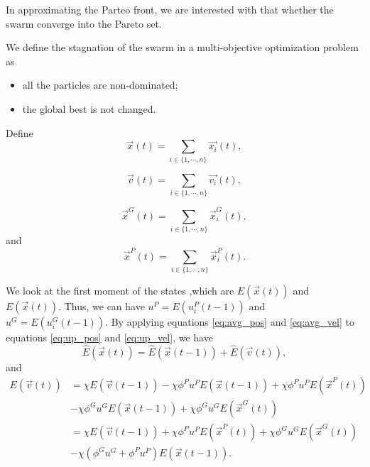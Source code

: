 \documentclass[12pt]{article}
\begin{document}
In approximating the Parteo front, we are interested with that whether the swarm converge into the Pareto set.

We define the stagnation of the swarm in a multi-objective optimization problem as
\begin{itemize}
\item all the particles are non-dominated;
\item the global best is not changed.
\end{itemize}

Define 
\begin{equation}
\label{eq:avg_pos}
\vec{x}(t) = \sum_{ i \in \{ 1, \cdots , n \} } \vec{x_{i}}(t),
\end{equation}

\begin{equation}
\label{eq:avg_vel}
\vec{v}(t) = \sum_{ i \in \{ 1, \cdots , n \} } \vec{v_{i}}(t),
\end{equation}

\begin{equation}
\label{eq:avg_gb}
\vec{x}^{G}(t) = \sum_{ i \in \{ 1, \cdots , n \} } \vec{x}^{G}_{i}(t),
\end{equation}
and
\begin{equation}
\label{eq:avg_pb}
\vec{x}^{P}(t) = \sum_{ i \in \{ 1, \cdots , n \} } \vec{x}^{P}_{i}(t).
\end{equation}

We look at the first moment of the states ,which are $ E(\vec{x}(t)) $ and $ E(\vec{x}(t)) $.
Thus, we can have $ u^{P} = E(u^{P}_{i}(t-1)) $ and $ u^{G} = E(u^{G}_{i}(t-1)) $.
By applying equations \eqref{eq:avg_pos} and \eqref{eq:avg_vel} to equations \eqref{eq:up_pos} and \eqref{eq:up_vel}, we have 
\begin{equation}
\hat{E}(\vec{x}(t)) =  \hat{E}(\vec{x}(t-1)) + \hat{E}(\vec{v}(t)),
\end{equation}
and 
\begin{equation}
\begin{aligned}
E(\vec{v}(t)) & = \chi E(\vec{v}(t-1))   - \chi \phi^{P} u^{P} E(\vec{x}(t-1)) + \chi \phi^{P} u^{P} E(\vec{x}^{P}(t)) \\
& - \chi \phi^{G} u^{G} E(\vec{x}(t-1)) + \chi \phi^{G} u^{G} E(\vec{x}^{G}(t)) \\
& = \chi E(\vec{v}(t-1))  + \chi \phi^{P} u^{P} E(\vec{x}^{P}(t)) + \chi \phi^{G} u^{G} E(\vec{x}^{G}(t)) \\
& - \chi (\phi^{G} u^{G} + \phi^{P} u^{P} ) E(\vec{x}(t-1)). 
\end{aligned}
\end{equation}
\end{document}
